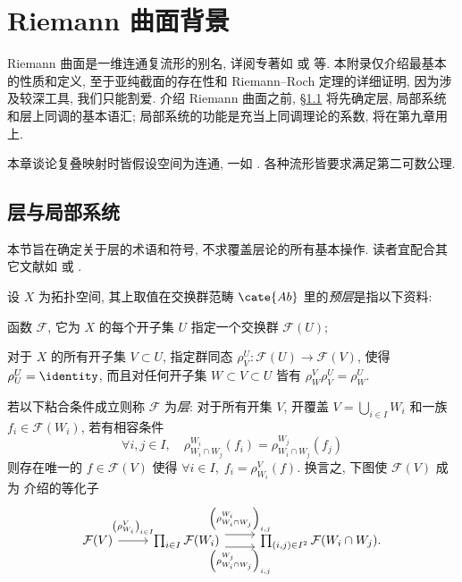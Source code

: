 
\chapter{Riemann 曲面背景}
Riemann 曲面是一维连通复流形的别名, 详阅专著如 \cite{Mei13} 或 \cite[第七章]{ChCh} 等. 本附录仅介绍最基本的性质和定义, 至于亚纯截面的存在性和 Riemann--Roch 定理的详细证明, 因为涉及较深工具, 我们只能割爱. 介绍 Riemann 曲面之前, \S\ref{sec:sheaves} 将先确定层, 局部系统和层上同调的基本语汇; 局部系统的功能是充当上同调理论的系数, 将在第九章用上.

本章谈论复叠映射时皆假设空间为连通, 一如 \cite[第五章]{You}. 各种流形皆要求满足第二可数公理.

\section{层与局部系统}\label{sec:sheaves}
本节旨在确定关于层的术语和符号, 不求覆盖层论的所有基本操作. 读者宜配合其它文献如 \cite[Chapter 2]{Di04} 或 \cite[第 3 章]{LZ}.

\begin{definition}
	设 $X$ 为拓扑空间, 其上取值在交换群范畴 $\cate{Ab}$ 里的\emph{预层}是指以下资料:
	\begin{compactitem}
		\item 函数 $\mathcal{F}$, 它为 $X$ 的每个开子集 $U$ 指定一个交换群 $\mathcal{F}(U)$;
		\item 对于 $X$ 的所有开子集 $V \subset U$, 指定群同态 $\rho^U_V: \mathcal{F}(U) \to \mathcal{F}(V)$, 使得 $\rho^U_U = \identity$, 而且对任何开子集 $W \subset V \subset U$ 皆有 $\rho^V_W \rho^U_V = \rho^U_W$.
	\end{compactitem}
	若以下粘合条件成立则称 $\mathcal{F}$ 为\emph{层}: 对于所有开集 $V$, 开覆盖 $V = \bigcup_{i \in I} W_i$ 和一族 $f_i \in \mathcal{F}(W_i)$, 若有相容条件
	\[ \forall i, j \in I, \quad \rho^{W_i}_{W_i \cap W_j}(f_i) = \rho^{W_j}_{W_i \cap W_j}(f_j) \]
	则存在唯一的 $f \in \mathcal{F}(V)$ 使得 $\forall i \in I, \; f_i = \rho^V_{W_i}(f)$. 换言之, 下图使 $\mathcal{F}(V)$ 成为 \cite[\S 2.7]{Li1} 介绍的等化子
	\[\begin{tikzcd}
		\mathcal{F}(V) \arrow[r, "{\left(\rho^V_{W_i}\right)_{i \in I}}" inner sep=0.5em] & \prod_{i \in I} \mathcal{F}(W_i) \arrow[r, yshift=0.5em, "{\left( \rho^{W_i}_{W_i \cap W_j} \right)_{i,j}}"] \arrow[r, yshift=-0.5em, "{ \left(\rho^{W_j}_{W_i \cap W_j} \right)_{i,j}}"'] & \prod_{(i, j) \in I^2} \mathcal{F}(W_i \cap W_j) .
	\end{tikzcd}\]
\end{definition}

